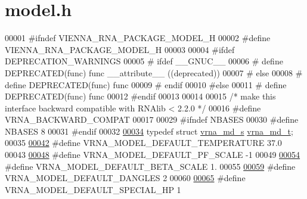 \hypertarget{model_8h_source}{}\section{model.\+h}
\label{model_8h_source}

\begin{DoxyCode}
00001 \textcolor{preprocessor}{#ifndef VIENNA\_RNA\_PACKAGE\_MODEL\_H}
00002 \textcolor{preprocessor}{#define VIENNA\_RNA\_PACKAGE\_MODEL\_H}
00003 
00004 \textcolor{preprocessor}{#ifdef DEPRECATION\_WARNINGS}
00005 \textcolor{preprocessor}{# ifdef \_\_GNUC\_\_}
00006 \textcolor{preprocessor}{#  define DEPRECATED(func) func \_\_attribute\_\_ ((deprecated))}
00007 \textcolor{preprocessor}{# else}
00008 \textcolor{preprocessor}{#  define DEPRECATED(func) func}
00009 \textcolor{preprocessor}{# endif}
00010 \textcolor{preprocessor}{#else}
00011 \textcolor{preprocessor}{# define DEPRECATED(func) func}
00012 \textcolor{preprocessor}{#endif}
00013 
00014 
00015 \textcolor{comment}{/* make this interface backward compatible with RNAlib < 2.2.0 */}
00016 \textcolor{preprocessor}{#define VRNA\_BACKWARD\_COMPAT}
00017 
00029 \textcolor{preprocessor}{#ifndef NBASES}
00030 \textcolor{preprocessor}{#define NBASES 8}
00031 \textcolor{preprocessor}{#endif}
00032 
\hypertarget{model_8h_source.tex_l00034}{}\hyperlink{group__model__details_ga1f8a10e12a0a1915f2a4eff0b28ea17c}{00034} \textcolor{keyword}{typedef} \textcolor{keyword}{struct }\hyperlink{structvrna__md__s}{vrna\_md\_s}  \hyperlink{structvrna__md__s}{vrna\_md\_t};
00035 
\hypertarget{model_8h_source.tex_l00042}{}\hyperlink{group__model__details_gaf47f9850b3b4763479f7a7e7a15648a2}{00042} \textcolor{preprocessor}{#define VRNA\_MODEL\_DEFAULT\_TEMPERATURE    37.0}
00043 
\hypertarget{model_8h_source.tex_l00048}{}\hyperlink{group__model__details_ga5505389cba74a18bbc116d2bb20256fa}{00048} \textcolor{preprocessor}{#define VRNA\_MODEL\_DEFAULT\_PF\_SCALE       -1}
00049 
\hypertarget{model_8h_source.tex_l00054}{}\hyperlink{group__model__details_ga383d3ac8d08c3b6221754b50871c1200}{00054} \textcolor{preprocessor}{#define VRNA\_MODEL\_DEFAULT\_BETA\_SCALE     1.}
00055 
\hypertarget{model_8h_source.tex_l00059}{}\hyperlink{group__model__details_ga2aa7bc2cae774b83a5c468f824c27a42}{00059} \textcolor{preprocessor}{#define VRNA\_MODEL\_DEFAULT\_DANGLES        2}
00060 
\hypertarget{model_8h_source.tex_l00065}{}\hyperlink{group__model__details_gabd1ab224e1048defd45c165ed7d1c108}{00065} \textcolor{preprocessor}{#define VRNA\_MODEL\_DEFAULT\_SPECIAL\_HP     1}

\end{DoxyCode}
